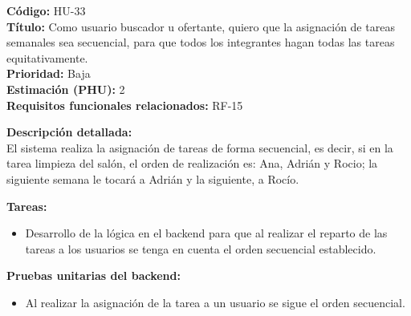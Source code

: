 \begin{tarjetaHU}
\textbf{Código:} HU-33 \\
\textbf{Título:} Como usuario buscador u ofertante, quiero que la asignación de tareas semanales sea secuencial, para que todos los integrantes hagan todas las tareas equitativamente. \\
\textbf{Prioridad:} Baja \\
\textbf{Estimación (PHU):} 2 \\
\textbf{Requisitos funcionales relacionados:} RF-15

\vspace{0.5em}
\textbf{Descripción detallada:} \\
El sistema realiza la asignación de tareas de forma secuencial, es decir, si en la tarea limpieza del salón, el orden de realización es: Ana, Adrián y Rocio; la siguiente semana le tocará a Adrián y la siguiente, a Rocío.

\vspace{0.5em}
\textbf{Tareas:}
\begin{itemize}[left=0pt]
  \item Desarrollo de la lógica en el backend para que al realizar el reparto de las tareas a los usuarios se tenga en cuenta el orden secuencial establecido.
\end{itemize}

\vspace{0.5em}
\textbf{Pruebas unitarias del backend:}
\begin{itemize}[left=0pt]
  \item Al realizar la asignación de la tarea a un usuario se sigue el orden secuencial.
\end{itemize}
\end{tarjetaHU}



